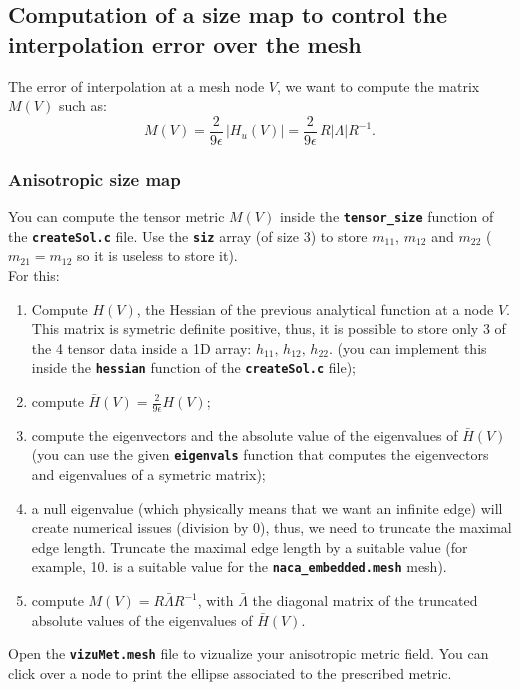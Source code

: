 \documentclass{article}
\newcommand{\ttb}[1]{\texttt{\textbf{#1}}}
\begin{document}
\subsection{Computation of a size map to control the interpolation error over the mesh}
The error of interpolation at a mesh node $V$, we want to compute
the matrix $M(V)$ such as:
$$
M(V) = \frac{2}{9\epsilon} \, \left | H_u(V) \right | = \frac{2}{9\epsilon} \, R
\left |\Lambda\right | R^{-1}.
$$

\subsubsection{Anisotropic size map}
You can compute the tensor metric $M(V)$ inside the \ttb{tensor\_size}
function of the \ttb{createSol.c} file. Use the \ttb{siz} array (of
size 3) to store $m_{11}$, $m_{12}$ and $m_{22}$ ($m_{21} = m_{12}$ so
it is useless to store it).\\

For this:

\begin{enumerate}
\item Compute $H(V)$, the Hessian of the previous analytical function
  at a node $V$. This matrix is symetric definite positive, thus, it
  is possible to store only 3 of the 4 tensor data inside a 1D array:
  $h_{11},\,h_{12},\,h_{22}$. (you can implement this
  inside the \ttb{hessian} function of the \ttb{createSol.c} file);
\item compute $\bar{H}(V) = \frac{2}{9\epsilon}H(V)$;
\item compute the eigenvectors and the absolute value of the
  eigenvalues of $\bar{H}(V)$ (you can use the given \ttb{eigenvals}
  function that computes the eigenvectors and eigenvalues of a
  symetric matrix);
\item a null eigenvalue (which physically means that we want an
  infinite edge) will create numerical issues (division by 0), thus, we
  need to truncate the maximal edge length. Truncate the maximal edge
  length by a suitable value (for example, 10. is a suitable value for
  the \ttb{naca\_embedded.mesh} mesh).
\item compute $M(V) = R \bar{\Lambda} R^{-1}$, with
  $\bar{\Lambda}$ the diagonal matrix of the truncated absolute values
  of the eigenvalues of $\bar{H}(V)$.
\end{enumerate}


Open the \ttb{vizuMet.mesh} file to vizualize your anisotropic metric field.
You can click over a node to print the ellipse associated to the prescribed metric.\\
\end{document}
